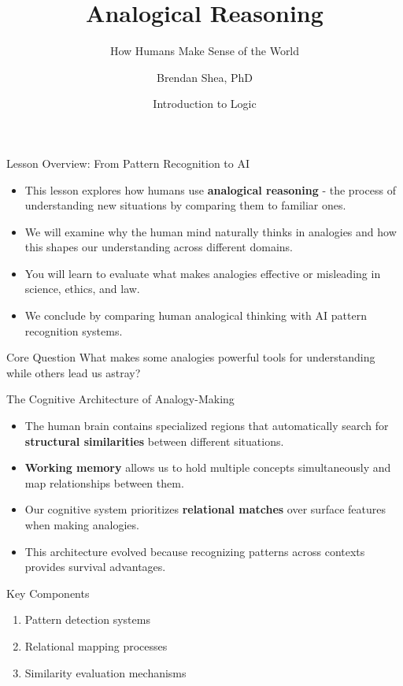 \documentclass{beamer}
\title{Analogical Reasoning}
\subtitle{How Humans Make Sense of the World}
\author{Brendan Shea, PhD}
\date{Introduction to Logic}
\begin{document}
	
	\frame{\titlepage}
	
	\begin{frame}{Lesson Overview: From Pattern Recognition to AI}
		\begin{itemize}
			\item This lesson explores how humans use \textbf{analogical reasoning} - the process of understanding new situations by comparing them to familiar ones.
			\item We will examine why the human mind naturally thinks in analogies and how this shapes our understanding across different domains.
			\item You will learn to evaluate what makes analogies effective or misleading in science, ethics, and law.
			\item We conclude by comparing human analogical thinking with AI pattern recognition systems.
		\end{itemize}
		
		\begin{alertblock}{Core Question}
			What makes some analogies powerful tools for understanding while others lead us astray?
		\end{alertblock}
	\end{frame}
	
	\begin{frame}{The Cognitive Architecture of Analogy-Making}
		\begin{itemize}
			\item The human brain contains specialized regions that automatically search for \textbf{structural similarities} between different situations.
			\item \textbf{Working memory} allows us to hold multiple concepts simultaneously and map relationships between them.
			\item Our cognitive system prioritizes \textbf{relational matches} over surface features when making analogies.
			\item This architecture evolved because recognizing patterns across contexts provides survival advantages.
		\end{itemize}
		
		\begin{block}{Key Components}
			\begin{enumerate}
				\item Pattern detection systems
				\item Relational mapping processes
				\item Similarity evaluation mechanisms
			\end{enumerate}
		\end{block}
	\end{frame}
	
\end{document}

